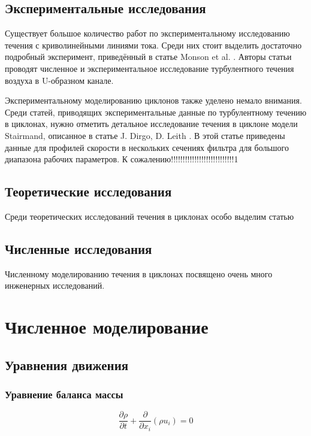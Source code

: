 \documentclass[pdftex,a4paper,12pt]{article}
\begin{document}
	\subsection{Экспериментальные исследования}
		\hspace{2em}Существует большое количество работ по экспериментальному исследованию течения с криволинейными линиями тока. Среди них стоит выделить достаточно подробный эксперимент, приведённый в статье Monson et al. \cite{Monson}. Авторы статьи проводят численное и экспериментальное исследование турбулентного течения воздуха в U-образном канале.
	
		Экспериментальному моделированию циклонов также уделено немало внимания. Среди статей, приводящих экспериментальные данные по турбулентному течению в циклонах, нужно отметить детальное исследование течения в циклоне модели Stairmand, описанное в статье J. Dirgo, D. Leith \cite{DirgoLeith}. В этой статье приведены данные для профилей скорости в нескольких сечениях фильтра для большого диапазона рабочих параметров. К сожалению!!!!!!!!!!!!!!!!!!!!!!!!!!!1
	\subsection{Теоретические исследования}
		\hspace{2em}Среди теоретических исследований течения в циклонах особо выделим статью 
	\subsection{Численные исследования}
		\hspace{2em}Численному моделированию течения в циклонах посвящено очень много инженерных исследований.
\newpage
\section{Численное моделирование}
	\subsection{Уравнения движения}
		\subsubsection{Уравнение баланса массы}
			\begin{equation}
				\frac{\partial \rho}{\partial t} + \frac{\partial}{\partial x_i}(\rho u_i) = 0
			\end{equation}
\end{document}
